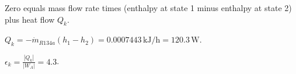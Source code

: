 Zero equals mass flow rate times (enthalpy at state 1 minus enthalpy at state 2) plus heat flow \( Q_k \).  

\( Q_k = -\dot{m}_{R134a} (h_1 - h_2) = 0.0007443 \, \text{kJ/h} = 120.3 \, \text{W} \).  

\( \epsilon_k = \frac{|Q_k|}{|W_A|} = 4.3 \).